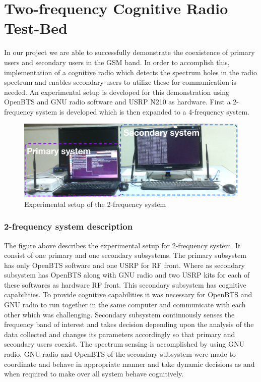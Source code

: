 \chapter{Two-frequency Cognitive Radio Test-Bed}

In our project we are able to successfully demonstrate the coexistence of 
primary users and secondary users in the GSM band. In order to accomplish this, 
implementation of a cognitive radio which detects the spectrum holes in the 
radio spectrum and enables secondary users to utilize these for communication 
is needed. An experimental setup is developed for this demonstration using 
OpenBTS and GNU radio software and USRP N210 as hardware. First a 2-frequency 
system is developed which is then expanded to a 4-frequency system.



\begin{figure}
\centering
\includegraphics[width=1\textwidth]{../images/freq2}
\caption[Experimental setup, 2-frequency system]{Experimental setup of the 
2-frequency system}
\label{freq2}
\end{figure}


\subsection{2-frequency system description}
The figure above describes the experimental setup for 2-frequency system. It 
consist of one primary and one secondary subsystems. The primary subsystem has 
only OpenBTS software and one USRP for RF front. Where as secondary subsystem 
has OpenBTS along with GNU radio and two USRP kits for each of these softwares 
as hardware RF front. This secondary subsystem has cognitive capabilities. To 
provide cognitive capabilities it was necessary for OpenBTS and GNU radio to run 
together in the same computer and communicate with each other which was challenging. 
Secondary subsystem continuously senses the frequency band of interest and  
takes decision depending upon the analysis of the data collected and changes 
its parameters accordingly so that primary and secondary users coexist. The 
spectrum sensing is accomplished by using GNU radio.  GNU radio and 
OpenBTS of the secondary subsystem were made to coordinate and behave in appropriate manner and take dynamic decisions 
as and when required to make over all system behave cognitively.

